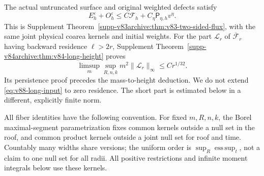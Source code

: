 The actual untruncated surface and original weighted defects satisfy
\begin{equation}\label{eq:v88-optical-input}
 E_h^\varepsilon+O_h^\varepsilon
     \le C\mathcal F_h+C_\eta\mathsf P_{\eta,h}v^\eta.
\end{equation}
This is Supplement Theorem~\ref{supp-v83archive:thm:v83-two-sided-flux},
with the same joint physical coarea kernels and initial weights.
For the part $\mathcal L_r$ of $\overline{\mathcal F}_r$ having
backward residence $\ell>2r$, Supplement
Theorem~\ref{supp-v84archive:thm:v84-long-height} proves
\begin{equation}\label{eq:v88-long-input}
 \limsup_m\sup_{R,n,k}m^2\|\mathcal L_r\|_\infty\le Cr^{1/32}.
\end{equation}
Its persistence proof precedes the mass-to-height deduction. We do
not extend \eqref{eq:v88-long-input} to zero residence. The short
part is estimated below in a different, explicitly finite norm.

All fiber identities have the following convention. For fixed
$m,R,n,k$, the Borel maximal-segment parametrization fixes common
kernels outside a null set in the roof, and common product kernels
outside a joint null set for roof and time. Countably many widths
share versions; the uniform order is $\sup_R\operatorname*{ess\,sup}_t$,
not a claim to one null set for all radii. All positive restrictions
and infinite moment integrals below use these kernels.

